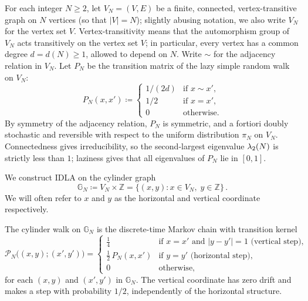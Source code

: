 \documentclass[11pt,a4paper,reqno]{amsart}
\theoremstyle{definition}
\newcommand{\cP}{\ensuremath{\mathcal P}}
\newcommand{\bbG}{{\ensuremath{\mathbb G}} }
\newcommand{\bbZ}{{\ensuremath{\mathbb Z}} }
\begin{document}
For each integer $N \geq 2$, let $V_N = (V, E)$ be a finite, connected, vertex-transitive graph on $N$ vertices (so that $|V| = N$); slightly abusing notation, we also write $V_N$ for the vertex set $V$. Vertex-transitivity means that the automorphism group of $V_N$ acts transitively on the vertex set $V$; in particular, every vertex has a common degree $d = d(N) \geq 1$, allowed to depend on $N$. Write $\sim$ for the adjacency relation in $V_N$. Let $P_N$ be the transition matrix of the lazy simple random walk on $V_N$:
\begin{equation}\label{eq:PN}
P_N(x, x') \coloneqq \begin{cases}
1/(2d) & \text{if } x \sim x', \\
1/2 & \text{if } x = x', \\
0 & \text{otherwise.}
\end{cases}
\end{equation}
By symmetry of the adjacency relation, $P_N$ is symmetric, and a fortiori doubly stochastic and reversible with respect to the uniform distribution $\pi_N$ on $V_N$. Connectedness gives irreducibility, so the second-largest eigenvalue $\lambda_2(N)$ is strictly less than $1$; laziness gives that all eigenvalues of $P_N$ lie in $[0, 1]$.

We construct IDLA on the cylinder graph 
\[
\bbG_N \coloneqq V_N \times \bbZ = \{ (x,y) : x \in V_N,\; y \in \bbZ \}\,.
\]
We will often refer to $x$ and $y$ as the horizontal and vertical coordinate respectively. 

The cylinder walk on $\bbG_N$ is the discrete-time Markov chain with transition kernel
 	\begin{equation}\label{def:SRW}
 	 \cP_N\big( (x,y) ; (x',y') \big) =
 	\begin{cases}
 	\frac{1}{4} & \mbox{if } x=x' \mbox{ and } |y-y'|=1 \mbox{ (vertical step),}
 	\\[3pt]
 	\frac{1}{2}\, P_N(x,x') & \mbox{if } y=y' \mbox{ (horizontal step),}
 	\\[3pt]
 	0 & \mbox{otherwise,}
 	\end{cases}
 	\end{equation}
for each $(x,y)$ and $(x',y')$ in $\bbG_N$. The vertical coordinate has zero drift and makes a step with probability $1/2$, independently of the horizontal structure.


\medskip
\end{document}
